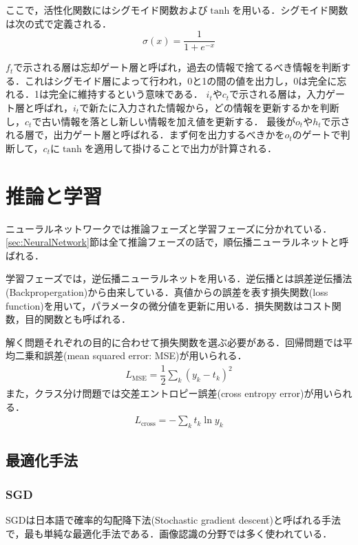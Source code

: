 ここで，活性化関数にはシグモイド関数および$\tanh$を用いる．シグモイド関数は次の式で定義される．
\begin{equation}\label{eq:sigmoid}
	\sigma (x) = \dfrac{1}{1 + e^{-x}}
\end{equation}

$f_t$で示される層は忘却ゲート層と呼ばれ，過去の情報で捨てるべき情報を判断する．これはシグモイド層によって行われ，0と1の間の値を出力し，0は完全に忘れる．1は完全に維持するという意味である．
$i_t$や$c_t$で示される層は，入力ゲート層と呼ばれ，$i_t$で新たに入力された情報から，どの情報を更新するかを判断し，$c_t$で古い情報を落とし新しい情報を加え値を更新する．
最後が$o_t$や$h_t$で示される層で，出力ゲート層と呼ばれる．まず何を出力するべきかを$o_t$のゲートで判断して，$c_t$に$\tanh$を適用して掛けることで出力が計算される．

\section{推論と学習}
ニューラルネットワークでは推論フェーズと学習フェーズに分かれている．\ref{sec:NeuralNetwork}節は全て推論フェーズの話で，順伝播ニューラルネットと呼ばれる．

学習フェーズでは，逆伝播ニューラルネットを用いる．逆伝播とは誤差逆伝播法(Backpropergation)から由来している．真値からの誤差を表す損失関数(loss function)を用いて，パラメータの微分値を更新に用いる．損失関数はコスト関数，目的関数とも呼ばれる．

解く問題それぞれの目的に合わせて損失関数を選ぶ必要がある．回帰問題では平均二乗和誤差(mean squared error: MSE)が用いられる．
\begin{align}\label{eq:mse}
	L_{\mathrm{MSE}} = \dfrac{1}{2} \sum_{k} (y_k - t_k)^2
\end{align}
また，クラス分け問題では交差エントロピー誤差(cross entropy error)が用いられる．
\begin{align}\label{eq:crossentropy}
	L_{\mathrm{cross}} = - \sum_k t_k \ln {y_k}
\end{align}


\subsection{最適化手法}
\subsubsection*{SGD}
SGDは日本語で確率的勾配降下法(Stochastic gradient descent)と呼ばれる手法で，最も単純な最適化手法である．画像認識の分野では多く使われている．

